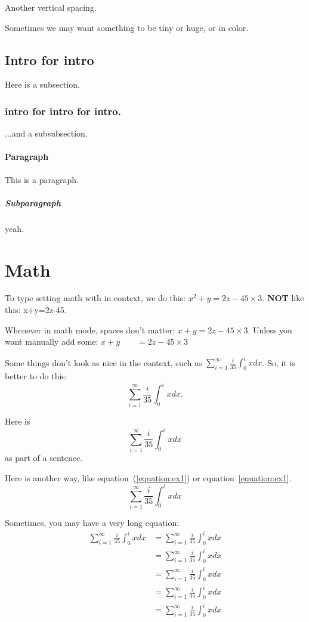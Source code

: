 \documentclass{article}
\theoremstyle{definition}
\theoremstyle{remark}
\begin{document}
\vskip 0.2in

Another vertical spacing.

Sometimes we may want something to be {\tiny tiny} or {\Huge huge}, or in {\color{red} color}.

\subsection{Intro for intro}

Here is a subsection.

\subsubsection{intro for intro for intro.}

...and a subsubsection.

\paragraph{Paragraph}  This is a paragraph.

\subparagraph{Subparagraph} yeah.

\section{Math}

To type setting math with in context, we do this: $x^2 + y = 2z - 45 \times 3$. {\bf NOT} like this: x+y=2z-45. 

Whenever in math mode, spaces don't matter: $x           +y=           2z-45\times      3$. Unless you want manually add some: $x+y \quad\quad =2z-45\times 3$

Some things don't look as nice in the context, such as $\sum_{i=1}^{\infty} \frac{i}{35} \int_{0}^i x dx$. So, it is better to do this: 
$$ \sum_{i=1}^{\infty} \frac{i}{35} \int_{0}^i x dx .$$

Here is 
\[ \sum_{i=1}^{\infty} \frac{i}{35} \int_{0}^i x dx \]
as part of a sentence.

Here is another way, like equation~(\ref{equation:ex1}) or equation~\eqref{equation:ex1}.
\begin{equation}\label{equation:ex1} 
\sum_{i=1}^{\infty} \frac{i}{35} \int_{0}^i x dx 
\end{equation}

Sometimes, you may have a very long equation:
\begin{align}\label{equation:ex2} 
\sum_{i=1}^{\infty} \frac{i}{35} \int_{0}^i x dx & = \sum_{i=1}^{\infty} \frac{i}{35} \int_{0}^i x dx \nonumber\\
& = \sum_{i=1}^{\infty} \frac{i}{35} \int_{0}^i x dx \nonumber\\
& = \sum_{i=1}^{\infty} \frac{i}{35} \int_{0}^i x dx \nonumber\\
& = \sum_{i=1}^{\infty} \frac{i}{35} \int_{0}^i x dx \nonumber \\
& = \sum_{i=1}^{\infty} \frac{i}{35} \int_{0}^i x dx
\end{align}
\end{document}
